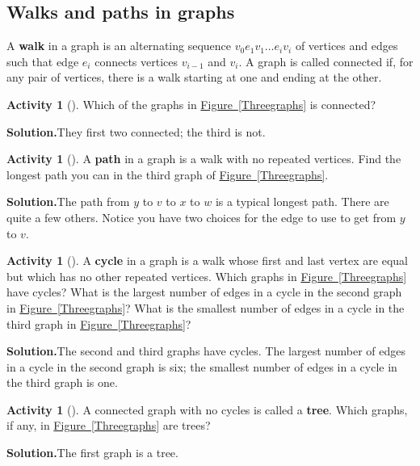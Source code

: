 \documentclass[10pt,]{book}
\newcommand{\terminology}[1]{\textbf{#1}}
\theoremstyle{plain}
\theoremstyle{definition}
\newtheorem{activity}[project]{Activity}
\numberwithin{equation}{chapter}
\begin{document}
\subsection[{Walks and paths in graphs}]{Walks and paths in graphs}\label{subsection-22}
A \terminology{walk} in a graph is an alternating sequence \(v_0e_1v_1\ldots
e_iv_i\) of vertices and edges such that edge \(e_i\) connects vertices \(v_{i-1}\) and \(v_i\). A graph is called connected if, for any pair of vertices, there is a walk starting at one and ending at the other.%
\begin{activity}[]\label{connectedanddisconnected}
Which of the graphs in \hyperref[Threegraphs]{Figure~\ref{Threegraphs}} is connected?%
\par\medskip\noindent%
\textbf{Solution.}\quad They first two connected; the third is not.%
\end{activity}
\begin{activity}[]\label{activity-97}
A \terminology{path} in a graph is a walk with no repeated vertices.  Find the longest path you can in the third graph of \hyperref[Threegraphs]{Figure~\ref{Threegraphs}}.%
\par\medskip\noindent%
\textbf{Solution.}\quad The path from \(y\) to \(v\) to \(x\) to \(w\) is a typical longest path. There are quite a few others. Notice you have two choices for the edge to use to get from \(y\) to \(v\).%
\end{activity}
\begin{activity}[]\label{activity-98}
A \terminology{cycle} in a graph is a walk whose first and last vertex are equal but which has no other repeated vertices.  Which graphs in \hyperref[Threegraphs]{Figure~\ref{Threegraphs}} have cycles?  What is the largest number of edges in a cycle in the second graph in \hyperref[Threegraphs]{Figure~\ref{Threegraphs}}?  What is the smallest number of edges in a cycle in the third graph in \hyperref[Threegraphs]{Figure~\ref{Threegraphs}}?%
\par\medskip\noindent%
\textbf{Solution.}\quad The second and third graphs have cycles. The largest number of edges in a cycle in the second graph is six; the smallest number of edges in a cycle in the third graph is one.%
\end{activity}
\begin{activity}[]\label{activity-99}
A connected graph with no cycles is called a \terminology{tree}.  Which graphs, if any, in \hyperref[Threegraphs]{Figure~\ref{Threegraphs}} are trees?%
\par\medskip\noindent%
\textbf{Solution.}\quad The first graph is a tree.%
\end{activity}
\typeout{************************************************}
\typeout{************************************************}
\end{document}
